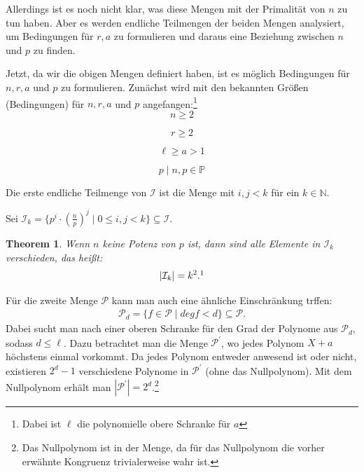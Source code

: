 \documentclass[12pt,oneside]{article}
\newtheorem{theorem}{Theorem}[section]
\theoremstyle{remark}
\theoremstyle{definition}
\begin{document}
\begin{flushleft}
Allerdings ist es noch nicht klar, was diese Mengen mit der Primalität von $n$ zu tun haben. Aber es werden endliche Teilmengen der beiden Mengen analysiert, um Bedingungen für $r,a$ zu formulieren und daraus eine Beziehung zwischen $n$ und $p$ zu finden.

Jetzt, da wir die obigen Mengen definiert haben, ist es möglich Bedingungen für $n,r,a$ und $p$ zu formulieren. Zunächst wird mit den bekannten Größen (Bedingungen) für $n,r,a$ und $p$ angefangen:\footnote{Dabei ist $\ell$ die polynomielle obere Schranke für $a$}
\begin{equation}
    n \geq 2 
\end{equation}

\begin{equation}
    r \geq 2
\end{equation}

\begin{equation}
\ell \geq  a > 1
\end{equation}

\begin{equation}
p \mid n, p \in \mathbb{P}    
\end{equation}

Die erste endliche Teilmenge von $\mathcal{I}$ ist die Menge mit $i,j < k$ für ein $k \in \mathbb{N}$.

Sei $\mathcal{I}_k= \{ p^{i} \cdot (\frac{n}{p})^j \mid 0 \leq i,j < k\} \subseteq \mathcal{I}$.\newline


\begin{theorem}\label{order-I-k}
Wenn $n$ keine Potenz von $p$ ist, dann sind alle Elemente in $\mathcal{I}_k$ verschieden, das heißt:
\begin{align*}
    |\mathcal{I}_k| = k^2.\footnotemark 
\end{align*}
\end{theorem}

Für die zweite Menge $\mathcal{P}$ kann man auch eine ähnliche Einschränkung trffen:
\begin{align*}
    \mathcal{P}_d = \{ f \in \mathcal{P} \mid deg f < d \} \subseteq \mathcal{P}.
\end{align*}
Dabei sucht man nach einer oberen Schranke für den Grad der Polynome aus $\mathcal{P}_d$, sodass $d \leq \ell$. Dazu betrachtet man die Menge $\mathcal{P}^{'}$, wo jedes Polynom $X + a$ höchstens einmal vorkommt. Da jedes Polynom entweder anwesend ist oder nicht, existieren $2^d - 1$ verschiedene Polynome in $\mathcal{P}^{'}$ (ohne das Nullpolynom). Mit dem Nullpolynom erhält man $|\mathcal{P}^{'}|= 2^d $.\footnote{Das Nullpolynom ist in der Menge, da für das Nullpolynom die vorher erwähnte Kongruenz trivialerweise wahr ist.}


\end{flushleft}
\end{document}
